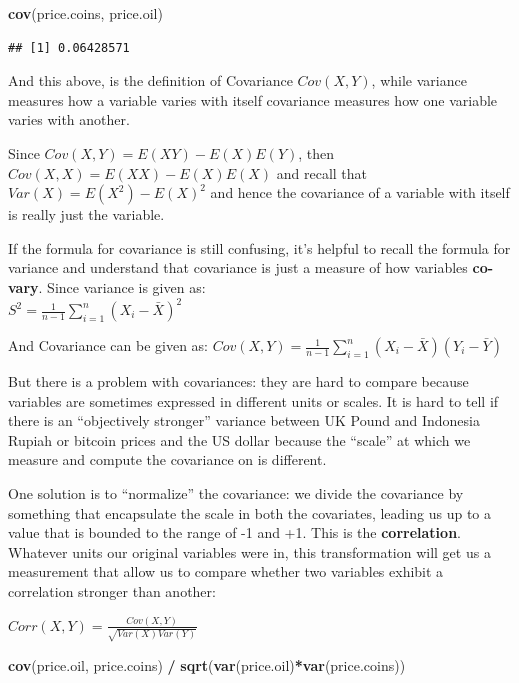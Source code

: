 \documentclass[]{article}
\newenvironment{Shaded}{\begin{snugshade}}{\end{snugshade}}
\newcommand{\KeywordTok}[1]{\textcolor[rgb]{0.13,0.29,0.53}{\textbf{#1}}}
\newcommand{\NormalTok}[1]{#1}
\newcommand{\OperatorTok}[1]{\textcolor[rgb]{0.81,0.36,0.00}{\textbf{#1}}}
\newcommand{\StringTok}[1]{\textcolor[rgb]{0.31,0.60,0.02}{#1}}
\begin{document}
\begin{Shaded}
\begin{Highlighting}[]
\KeywordTok{cov}\NormalTok{(price.coins, price.oil)}
\end{Highlighting}
\end{Shaded}

\begin{verbatim}
## [1] 0.06428571
\end{verbatim}

And this above, is the definition of Covariance \(Cov(X,Y)\), while
variance measures how a variable varies with itself covariance measures
how one variable varies with another.

Since \(Cov(X,Y) = E(XY) - E(X)E(Y)\), then
\(Cov(X,X) = E(XX) - E(X)E(X)\) and recall that
\(Var(X) = E(X^2) - E(X)^2\) and hence the covariance of a variable with
itself is really just the variable.

If the formula for covariance is still confusing, it's helpful to recall
the formula for variance and understand that covariance is just a
measure of how variables \textbf{co-vary}. Since variance is given as:\\
\(S^2 = \frac{1}{n-1} \sum \limits^{n}_{i=1}(X_i-\bar{X})^2\)

And Covariance can be given as:
\(Cov(X,Y) = \frac{1}{n-1} \sum \limits^{n}_{i=1} (X_i-\bar{X})(Y_i-\bar{Y})\)

But there is a problem with covariances: they are hard to compare
because variables are sometimes expressed in different units or scales.
It is hard to tell if there is an ``objectively stronger'' variance
between UK Pound and Indonesia Rupiah or bitcoin prices and the US
dollar because the ``scale'' at which we measure and compute the
covariance on is different.

One solution is to ``normalize'' the covariance: we divide the
covariance by something that encapsulate the scale in both the
covariates, leading us up to a value that is bounded to the range of -1
and +1. This is the \textbf{correlation}. Whatever units our original
variables were in, this transformation will get us a measurement that
allow us to compare whether two variables exhibit a correlation stronger
than another:

\(Corr(X,Y) = \frac{Cov(X,Y)}{\sqrt{Var(X)Var(Y)}}\)

\begin{Shaded}
\begin{Highlighting}[]
\KeywordTok{cov}\NormalTok{(price.oil, price.coins) }\OperatorTok{/}\StringTok{ }\KeywordTok{sqrt}\NormalTok{(}\KeywordTok{var}\NormalTok{(price.oil)}\OperatorTok{*}\KeywordTok{var}\NormalTok{(price.coins))}
\end{Highlighting}
\end{Shaded}
\end{document}
